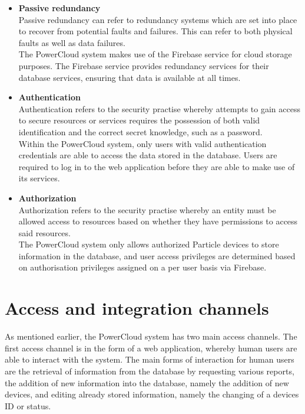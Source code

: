 \documentclass{article}
\begin{document}
\begin{itemize}
		\item \textbf{Passive redundancy}\\
		Passive redundancy can refer to redundancy systems which are set into 
		place to recover from potential faults and failures. This can refer to 
		both physical faults as well as data failures.\\
		
		The PowerCloud system makes use of the Firebase service for cloud 
		storage purposes. The Firebase service provides redundancy services for 
		their database services, ensuring that data is available at all times.

		\item \textbf{Authentication}\\
		Authentication refers to the security practise whereby attempts to gain 
		access to secure resources or services requires the possession of both 
		valid identification and the correct secret knowledge, such as a 
		password.\\
		
		Within the PowerCloud system, only users with valid authentication 
		credentials are able to access the data stored in the database. Users 
		are required to log in to the web application before they are able to 
		make use of its services.
		
		\item \textbf{Authorization}\\
		Authorization refers to the security practise whereby an entity must be 
		allowed access to resources based on whether they have permissions to 
		access said resources.\\
		
		The PowerCloud system only allows authorized Particle devices to store 
		information in the database, and user access privileges are determined 
		based on authorisation privileges assigned on a per user basis via 
		Firebase.
	\end{itemize}

\newpage

\section{Access and integration channels}
	
	As mentioned earlier, the PowerCloud system has two main access 
	channels. The first access channel is in the form of a web 
	application, whereby human users are able to interact with the 
	system. The main forms of interaction for human users are the 
	retrieval of information from the database by requesting various 
	reports, the addition of new information into the database, namely 
	the addition of new devices, and editing already stored information, 
	namely the changing of a devices ID or status.\\
	
\end{document}
